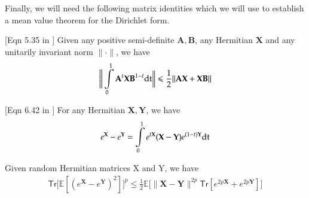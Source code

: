 Finally, we will need the following matrix identities which we will use to establish a mean value theorem for the Dirichlet form.

\begin{fact}{[Eqn 5.35 in \cite{Bhatia07}]}\label{fct:intNorm} Given any positive semi-definite $\mathbf{A},\mathbf{B}$, any Hermitian $\mathbf{X}$ and any unitarily invariant norm $\| \cdot \|$, we have
  \begin{align*}
    \bigg\|\small\intop_{0}^{1}\mathbf{A}^{t}\mathbf{XB}^{1-t}\mathrm{dt}\bigg\| \leq \frac{1}{2}\|\mathbf{AX} + \mathbf{XB}\|
  \end{align*}
\end{fact}

\begin{fact}{[Eqn 6.42 in \cite{Bhatia07}]}\label{fct:duhamel} For any Hermitian $\mathbf{X},\mathbf{Y}$, we have \begin{align*}
  e^\mathbf{X}-e^{\mathbf{Y}} = \intop_{0}^{1}e^{t\mathbf{X}}(\mathbf{X}-\mathbf{Y})e^{(1-t)\mathbf{Y}}\mathrm{dt}
\end{align*}
\end{fact}
\begin{lemma}\label{lem:var} Given random Hermitian matrices X and Y, we have
  \begin{align*}
    \mathsf{Tr}\big[ \mathbb{E}[(e^\mathbf{X}-e^\mathbf{Y})^2]\big]^p\leq \frac{1}{2}\mathbb{E}\big[\|\mathbf{X}-\mathbf{Y}\|^{2p}\mathsf{Tr}[e^{2p\mathbf{X}}+e^{2p\mathbf{Y}}]\big]
  \end{align*}
\end{lemma}
